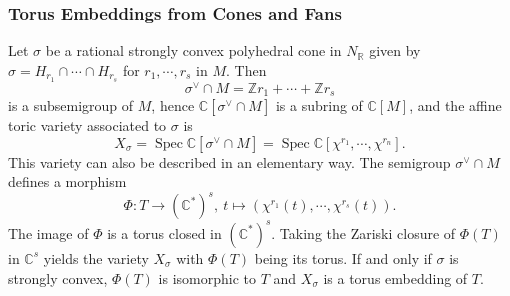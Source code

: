 \documentclass[11pt,english]{smfart}
\newtheorem{proposition}{Proposition}[section]
\theoremstyle{definition}
\theoremstyle{remark}
\newcommand{\R}{\mathbb{R}}
\renewcommand{\C}{\mathbb{C}}
\newcommand{\Z}{\mathbb{Z}}
\DeclareMathOperator{\im}{im} %
\DeclareMathOperator{\spec}{Spec} %
\renewcommand{\hom}{\mathrm{Hom}}
\begin{document}


\subsubsection{Torus Embeddings from Cones and Fans}
Let $\sigma$ be a rational strongly convex polyhedral cone in $N_{\R}$ given by $\sigma = H_{r_1}\cap\cdots\cap H_{r_s}$ for $r_1, \cdots, r_s$ in $M$. Then \[\sigma^{\vee}\cap M = \Z r_1 + \cdots + \Z r_s\] is a subsemigroup of $M$, hence $\C[\sigma^{\vee}\cap M]$ is a subring of $\C[M]$,
and the affine toric variety associated to $\sigma$ is \[X_{\sigma} = \spec\C[\sigma^{\vee}\cap M] = \spec\C[\chi^{r_1}, \cdots, \chi^{r_n}].\]
This variety can also be described in an elementary way. The semigroup $\sigma^{\vee}\cap M$ defines a morphism\[\Phi: T\to (\C^*)^s,\ t\mapsto (\chi^{r_1}(t), \cdots, \chi^{r_s}(t)).\]
The image of $\Phi$ is a torus closed in $(\C^*)^s$. Taking the Zariski closure of $\Phi(T)$ in $\C^s$ yields the variety $X_\sigma$ with $\Phi(T)$ being its torus.
If and only if $\sigma$ is strongly convex, $\Phi(T)$ is isomorphic to $T$ and $X_\sigma$ is a torus embedding of $T$.
\end{document}
